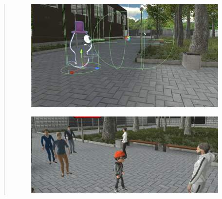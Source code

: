 \begin{quote}
	\begin{figure}
		\centering
		\includegraphics[width=0.5\linewidth]{img/SemihSoenmez_IMG/dynamischerGegner}
		\caption{}
		\label{fig:dynamischergegner}
	\end{figure}

	\begin{figure}
		\centering
		\includegraphics[width=0.7\linewidth]{img/SemihSoenmez_IMG/andereCharakter}
		\caption{}
		\label{fig:anderecharakter}
	\end{figure}


	

	


\end{quote}
